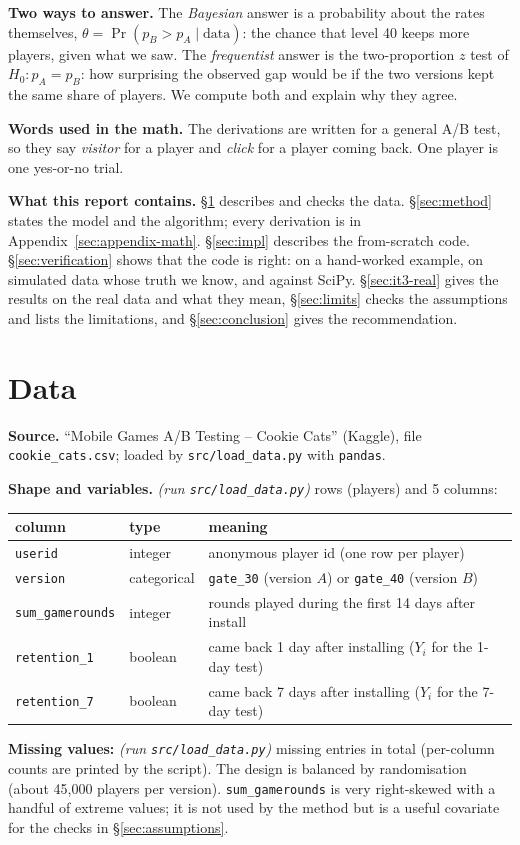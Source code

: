 \documentclass[11pt]{article}
\theoremstyle{definition}
\theoremstyle{remark}
\renewcommand{\Pr}{\operatorname{Pr}}
\newcommand{\data}{\text{data}}
\newcommand{\dataRows}{\emph{(run \texttt{src/load\_data.py})}}
\newcommand{\dataCols}{5}
\newcommand{\dataMissing}{\emph{(run \texttt{src/load\_data.py})}}}
\begin{document}
\textbf{Two ways to answer.} The \emph{Bayesian} answer is a probability about the rates themselves,
$\theta=\Pr(p_B>p_A\mid\data)$: the chance that level 40 keeps more players, given what we saw. The
\emph{frequentist} answer is the two-proportion $z$ test of $H_0:p_A=p_B$: how surprising the observed gap would be
if the two versions kept the same share of players. We compute both and explain why they agree.

\textbf{Words used in the math.} The derivations are written for a general A/B test, so they say \emph{visitor}
for a player and \emph{click} for a player coming back. One player is one yes-or-no trial.

\textbf{What this report contains.} \S\ref{sec:data} describes and checks the data. \S\ref{sec:method} states the
model and the algorithm; every derivation is in Appendix~\ref{sec:appendix-math}. \S\ref{sec:impl} describes the
from-scratch code. \S\ref{sec:verification} shows that the code is right: on a hand-worked example, on simulated
data whose truth we know, and against SciPy. \S\ref{sec:it3-real} gives the results on the real data and what they
mean, \S\ref{sec:limits} checks the assumptions and lists the limitations, and \S\ref{sec:conclusion} gives the
recommendation.

\section{Data}\label{sec:data}

\textbf{Source.} ``Mobile Games A/B Testing -- Cookie Cats'' (Kaggle), file \texttt{cookie\_cats.csv};
loaded by \texttt{src/load\_data.py} with \texttt{pandas}.

\textbf{Shape and variables.} \dataRows{} rows (players) and \dataCols{} columns:
\begin{center}
\begin{tabular}{llp{7.5cm}}\toprule
column & type & meaning\\ \midrule
\texttt{userid} & integer & anonymous player id (one row per player)\\
\texttt{version} & categorical & \texttt{gate\_30} (version $A$) or \texttt{gate\_40} (version $B$)\\
\texttt{sum\_gamerounds} & integer & rounds played during the first 14 days after install\\
\texttt{retention\_1} & boolean & came back 1 day after installing ($Y_i$ for the 1-day test)\\
\texttt{retention\_7} & boolean & came back 7 days after installing ($Y_i$ for the 7-day test)\\
\bottomrule
\end{tabular}
\end{center}
\textbf{Missing values:} \dataMissing{} missing entries in total (per-column counts are printed by the script).
The design is balanced by randomisation (about 45{,}000 players per version). \texttt{sum\_gamerounds} is very
right-skewed with a handful of extreme values; it is not used by the method but is a useful covariate for the
checks in \S\ref{sec:assumptions}.
\end{document}
